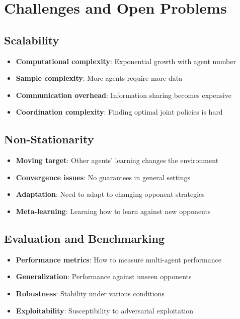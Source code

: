\section{Challenges and Open Problems}

\subsection{Scalability}

\begin{itemize}
    \item \textbf{Computational complexity}: Exponential growth with agent number
    \item \textbf{Sample complexity}: More agents require more data
    \item \textbf{Communication overhead}: Information sharing becomes expensive
    \item \textbf{Coordination complexity}: Finding optimal joint policies is hard
\end{itemize}

\subsection{Non-Stationarity}

\begin{itemize}
    \item \textbf{Moving target}: Other agents' learning changes the environment
    \item \textbf{Convergence issues}: No guarantees in general settings
    \item \textbf{Adaptation}: Need to adapt to changing opponent strategies
    \item \textbf{Meta-learning}: Learning how to learn against new opponents
\end{itemize}

\subsection{Evaluation and Benchmarking}

\begin{itemize}
    \item \textbf{Performance metrics}: How to measure multi-agent performance
    \item \textbf{Generalization}: Performance against unseen opponents
    \item \textbf{Robustness}: Stability under various conditions
    \item \textbf{Exploitability}: Susceptibility to adversarial exploitation
\end{itemize}

